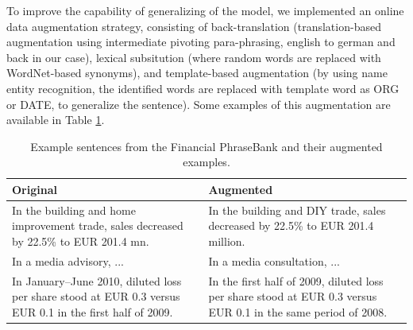 \documentclass[conference]{IEEEtran}
\begin{document}
To improve the capability of generalizing of the model, we implemented an online data augmentation strategy, consisting of back-translation (translation-based augmentation using intermediate pivoting para-phrasing, english to german and back in our case), lexical subsitution (where random words are replaced with WordNet-based synonyms), and template-based augmentation (by using name entity recognition, the identified words are replaced with template word as ORG or DATE, to generalize the sentence). Some examples of this augmentation are available in Table \ref{tab:fpb_augm_examples}.









\begin{table}[ht]
\centering
\caption{Example sentences from the Financial PhraseBank and their augmented examples.}
\label{tab:fpb_augm_examples}
\begin{tabular}{p{3.5cm}p{3.5cm}}
\toprule
\textbf{Original} & \textbf{Augmented} \\
\midrule
In the building and home improvement trade, sales decreased by 22.5\% to EUR 201.4 mn. & In the building and DIY trade, sales decreased by 22.5\% to EUR 201.4 million. \\
In a media advisory, ... & In a media consultation, ... \\
In January–June 2010, diluted loss per share stood at EUR 0.3 versus EUR 0.1 in the first half of 2009. & In the first half of 2009, diluted loss per share stood at EUR 0.3 versus EUR 0.1 in the same period of 2008. \\
\bottomrule
\end{tabular}
\end{table}
\end{document}
